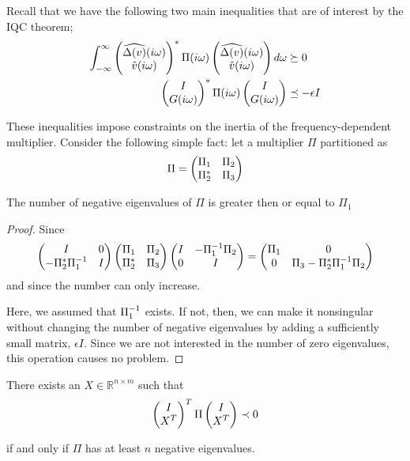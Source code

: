 Recall that we have the following two main inequalities that are of interest by the IQC theorem;
\begin{align}\label{eq:interlude1}
\int_{-\infty}^\infty{\begin{pmatrix}\widehat{\Delta(v)}(i\omega)\\\hat{v}(i\omega)\end{pmatrix}^*\Pi(i\omega)\begin{pmatrix}\widehat{\Delta(v)}(i\omega)\\\hat{v}(i\omega)\end{pmatrix}d\omega} &\succeq 0\\
\label{eq:interlude2}
\begin{pmatrix}I\\G(i\omega)\end{pmatrix}^*\Pi(i\omega)\begin{pmatrix}I\\G(i\omega)\end{pmatrix} &\preceq -\epsilon I
\end{align}

These inequalities impose constraints on the inertia of the frequency-dependent multiplier. Consider the following 
simple fact: let a multiplier $\Pi$ partitioned as
\begin{equation}
\Pi = \begin{pmatrix}\Pi_1&\Pi_2\\\Pi_2^* &\Pi_3\end{pmatrix}
\label{eq:Pipartition}
\end{equation}


\begin{lem}\label{lem:negnag}
The number of negative eigenvalues of $\Pi$ is greater then or equal to $\Pi_1$ 
\end{lem}


\begin{proof}
Since
\[
\begin{pmatrix}I&0\\-\Pi_2^*\Pi_1^{-1} &I\end{pmatrix}\begin{pmatrix}\Pi_1&\Pi_2\\ \Pi_2^* &\Pi_3\end{pmatrix}
\begin{pmatrix}I&-\Pi_1^{-1}\Pi_2\\0&I\end{pmatrix} = \begin{pmatrix}\Pi_1&0\\0 &\Pi_3-\Pi_2^*\Pi_1^{-1}\Pi_2\end{pmatrix}
\]
and since the number can only increase. 

Here, we assumed that $\Pi_1^{-1}$ exists. If not, then, we can make it nonsingular without changing the number of 
negative eigenvalues by adding a sufficiently small matrix, $\epsilon I$. Since we are not interested in the number 
of zero eigenvalues, this operation causes no problem.
\end{proof}


\begin{lem}\label{lem:inertialemma} There exists an $X\in \mathbb{R}^{n\times m}$ such that 
\begin{equation}
\begin{pmatrix}I\\X^T\end{pmatrix}^T\Pi\begin{pmatrix}I\\X^T\end{pmatrix} \prec 0
\label{eq:multinertia}
\end{equation}

if and only if $\Pi$ has at least $n$ negative eigenvalues.
\end{lem}

